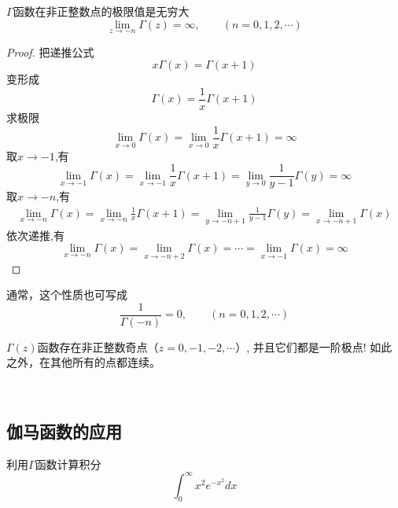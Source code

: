 		\begin{proposition}
			$\Gamma$函数在非正整数点的极限值是无穷大
			\begin{equation}
				\lim\limits_{z\to -n }\Gamma(z)=\infty, \qquad (n=0,1,2, \cdots)
			\end{equation}
			\end{proposition}
			\begin{proof}
	把递推公式
		\[x\Gamma(x)= \Gamma(x+1) \]
		变形成
		\[\Gamma(x)=\frac{1}{x} \Gamma(x+1) \]
		求极限
		\[\lim\limits_{x\to 0 }	\Gamma(x)=	\lim\limits_{x\to 0 } \frac{1}{x} \Gamma(x+1) =\infty \]
	取$x\to -1$,有
	\[\lim\limits_{x\to -1 }\Gamma(x)=\lim\limits_{x\to -1 } \frac{1}{x} \Gamma(x+1) =  \lim\limits_{y\to 0 } \frac{1}{y-1} \Gamma(y) =\infty \]
	取$x\to -n$,有
		\begin{equation*}
		\begin{split}
			\lim\limits_{x\to -n }	\Gamma(x)=\lim\limits_{x\to -n } \frac{1}{x} \Gamma(x+1) 
			=\lim\limits_{y\to -n+1 } \frac{1}{y-1} \Gamma(y)  = \lim\limits_{x\to -n+1 }  \Gamma(x)
		\end{split}
		\end{equation*}	
	依次递推,有
	\[ 	\lim\limits_{x\to -n }	\Gamma(x) = \lim\limits_{x\to -n+2 }\Gamma(x) =\cdots  =\lim\limits_{x\to -1 }\Gamma(x) = \infty
	 \]
		\end{proof}
		通常，这个性质也可写成
		\begin{equation} \boxed{\frac{1}{\Gamma(-n)} =0, \qquad (n=0,1,2, \cdots)} \end{equation}
	\begin{hint} 
		$\Gamma(z)$函数存在非正整数奇点（$z = 0,-1,-2,\cdots$）, 并且它们都是一阶极点! 如此之外，在其他所有的点都连续。
	\end{hint}
	~~\\
	
	\subsection{伽马函数的应用}
	
	\begin{example}
	利用$\Gamma$函数计算积分
		\[ \int_{0}^{\infty} x^2 e^{-x^2} dx \]
	\end{example}
	
